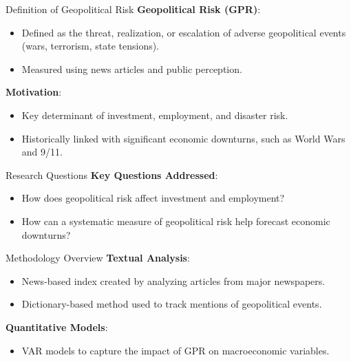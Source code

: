 \documentclass[11pt]{beamer}
\begin{document}
\begin{frame}{Definition of Geopolitical Risk}
\textbf{Geopolitical Risk (GPR)}:

	\begin{itemize}
		\item Defined as the threat, realization, or escalation of adverse geopolitical events (wars, terrorism, state tensions).

		\item Measured using news articles and public perception.

	\end{itemize}
\textbf{Motivation}:

	\begin{itemize}
		\item Key determinant of investment, employment, and disaster risk.

		\item Historically linked with significant economic downturns, such as World Wars and 9/11.

	\end{itemize}


\end{frame}
\begin{frame}{Research Questions}
\textbf{Key Questions Addressed}:

	\begin{itemize}
		\item How does geopolitical risk affect investment and employment?

		\item How can a systematic measure of geopolitical risk help forecast economic downturns?
	\end{itemize}
\end{frame}
\begin{frame}{Methodology Overview}
\textbf{Textual Analysis}:

	\begin{itemize}
		\item News-based index created by analyzing articles from major newspapers.

		\item Dictionary-based method used to track mentions of geopolitical events.

	\end{itemize}
\textbf{Quantitative Models}:

	\begin{itemize}
		\item VAR models to capture the impact of GPR on macroeconomic variables.
	\end{itemize}
\end{frame}
\end{document}
